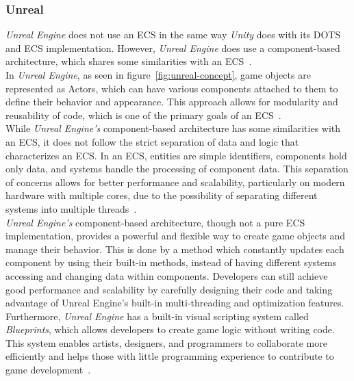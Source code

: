 \subsubsection{Unreal}\label{subsubsec:unreal:-component-based-architecture}
\textit{Unreal Engine} does not use an \gls{ECS} in the same way \textit{Unity} does with its \gls{DOTS} and \gls{ECS} implementation.
However, \textit{Unreal Engine} does use a component-based architecture, which shares some similarities with an ECS~\cite{UNREAL:Framework}.
\\
In \textit{Unreal Engine}, as seen in figure~\ref{fig:unreal-concept}, game objects are represented as Actors, which can have
various components attached to them to define their behavior and appearance.
This approach allows for modularity and reusability of code, which is one of the primary goals of an ECS~\cite{UNREAL:Framework}.
\\
While \textit{Unreal Engine's} component-based architecture has some similarities with an ECS, it does not follow the strict separation of
data and logic that characterizes an ECS. In an ECS, entities are simple identifiers, components hold only data, and systems
handle the processing of component data.
This separation of concerns allows for better performance and scalability, particularly on modern hardware with multiple cores, due to the possibility
of separating different systems into multiple threads~\cite{UNREAL:Framework}.
\\
\textit{Unreal Engine's} component-based architecture, though not a pure ECS implementation, provides a powerful
and flexible way to create game objects and manage their behavior.
This is done by a method which constantly updates each component by using their built-in methods, instead of having different systems accessing and changing data within components.
Developers can still achieve good performance and scalability by carefully designing their code and taking
advantage of Unreal Engine's built-in multi-threading and optimization features.
\\
Furthermore, \textit{Unreal Engine} has a built-in visual scripting system called \textit{Blueprints}, which allows developers to create game logic without writing code.
This system enables artists, designers, and programmers to collaborate more efficiently and helps those with little programming experience to contribute
to game development~\cite{UNREAL:Framework}.
